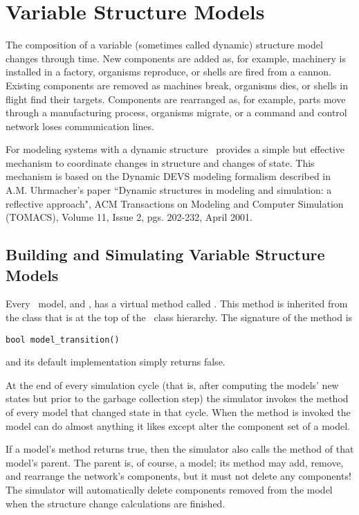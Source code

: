 \chapter{Variable Structure Models}
The composition of a variable (sometimes called dynamic) structure model changes through time. New components are added as, for example, machinery is installed in a factory, organisms reproduce, or shells are fired from a cannon. Existing components are removed as machines break, organisms dies, or shells in flight find their targets. Components are rearranged as, for example, parts move through a manufacturing process, organisms migrate, or a command and control network loses communication lines.

For modeling systems with a dynamic structure \adevs\ provides a simple but effective mechanism to coordinate changes in structure and changes of state. This mechanism is based on the Dynamic DEVS modeling formalism described in A.M. Uhrmacher's paper ``Dynamic structures in modeling and simulation: a reflective approach", ACM Transactions on Modeling and Computer Simulation (TOMACS), Volume 11, Issue 2, pgs. 202-232, April 2001.

\section{Building and Simulating Variable Structure Models}
Every \adevs\ model,  and , has a virtual method called . This method is inherited from the  class that is at the top of the \adevs\ class hierarchy. The signature of the  method is
\begin{verbatim}
bool model_transition()
\end{verbatim}
and its default implementation simply returns false.

At the end of every simulation cycle (that is, after computing the models' new states but prior to the garbage collection step) the simulator invokes the  method of every  model that changed state in that cycle. When the  method is invoked the  model can do almost anything it likes except alter the component set of a  model.

If a model's  method returns true, then the simulator also calls the  method of that model's parent.
The parent is, of course, a  model; its  method may add, remove, and rearrange the network's components, but it must not delete any components! The simulator will automatically delete components removed from the model when the structure change calculations are finished.

